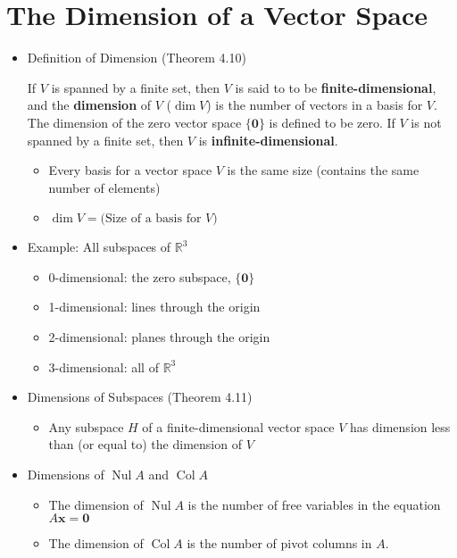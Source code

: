 \documentclass[10pt]{book}
\newenvironment{boxdef}{\begin{mdframed}[backgroundcolor=gray!30,linewidth=0pt,nobreak=true]}{\end{mdframed}}
\newcommand{\R}{\mathbb{R}}
\newcommand{\vect}[1]{\ensuremath{\boldsymbol{\mathbf{#1}}}}
\DeclareMathOperator{\Nul}{Nul}
\DeclareMathOperator{\Col}{Col}
\newcommand{\Axz}{A\vect{x}=\vect{0}}
\begin{document}
\section{The Dimension of a Vector Space}
\begin{itemize}
	\item Definition of Dimension (Theorem 4.10)
		\begin{boxdef}
			If $V$ is spanned by a finite set, then $V$ is said to to be \textbf{finite-dimensional}, and the \textbf{dimension} of $V$ ($\dim V$) is the number of vectors in a basis for $V$. The dimension of the zero vector space $\{\vect{0}\}$ is defined to be zero. If $V$ is not spanned by a finite set, then $V$ is \textbf{infinite-dimensional}.
		\end{boxdef}
		\begin{itemize}
			\item Every basis for a vector space $V$ is the same size (contains the same number of elements)
			\item $\dim V = \text{(Size of a basis for $V$)} $
		\end{itemize}
	\item Example: All subspaces of $\R^3$
		\begin{multicols}{2}
			\begin{itemize}\itemsep 0em
				\item 0-dimensional: the zero subspace, $\{\vect{0}\}$
				\item 1-dimensional: lines through the origin
				\item 2-dimensional: planes through the origin
				\item 3-dimensional: all of $\R^3$
			\end{itemize}
		\end{multicols}
	\item Dimensions of Subspaces (Theorem 4.11)
		\begin{itemize}
			\item Any subspace $H$ of a finite-dimensional vector space $V$ has dimension less than (or equal to) the dimension of $V$
		\end{itemize}
	\item Dimensions of $\Nul A$ and $\Col A$
		\begin{itemize}
			\item The dimension of $\Nul A$ is the number of free variables in the equation $\Axz$
			\item The dimension of $\Col A$ is the number of pivot columns in $A$.
		\end{itemize}
\end{itemize}
\end{document}
